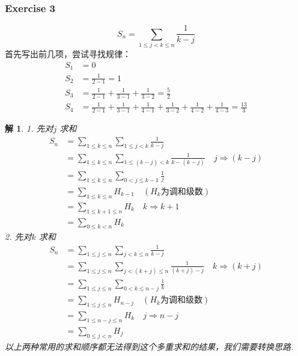 \documentclass[mode=geye]{elegantnote}
\newtheorem{solve}{解}
\begin{document}
\subsubsection{Exercise 3}
\begin{equation*}
    S_n = \sum_{1\leqslant j < k\leqslant n}\frac{1}{k-j}
\end{equation*}
首先写出前几项，尝试寻找规律：
\begin{align*}
    S_1 &= 0\\
    S_2 &= \frac{1}{2-1} = 1\\
    S_3 &= \frac{1}{2-1}+\frac{1}{3-1}+\frac{1}{3-2} = \frac{5}{2}\\
    S_4 &= \frac{1}{2-1}+\frac{1}{3-1}+\frac{1}{4-1}+\frac{1}{3-2}+\frac{1}{4-2}+\frac{1}{4-3} = \frac{13}{3}
\end{align*}
\begin{solve}
    1. 先对$ j $ 求和
    \begin{align*}
        S_n 
        &= \sum_{1\leqslant k \leqslant n} \sum_{1\leqslant j < k}\frac{1}{k-j}\\
        &= \sum_{1\leqslant k \leqslant n} \sum_{1\leqslant (k-j) < k}\frac{1}{k-(k-j)} \quad j\Rightarrow (k-j) \\
        &= \sum_{1\leqslant k \leqslant n} \sum_{0<j\leqslant k-1}\frac{1}{j} \\
        &= \sum_{1\leqslant k \leqslant n} H_{k-1} \quad(H_k\text{为调和级数})\\
        &= \sum_{1\leqslant k+1 \leqslant n} H_{k}\quad k\Rightarrow k+1 \\
        &= \sum_{0\leqslant k < n} H_{k}
    \end{align*}
    2. 先对$ k $ 求和
    \begin{align*}
        S_n 
        &= \sum_{1\leqslant j \leqslant n} \sum_{j < k\leqslant n}\frac{1}{k-j}\\
        &= \sum_{1\leqslant j \leqslant n} \sum_{j < (k+j)\leqslant n}\frac{1}{(k+j)-j} \quad k\Rightarrow (k+j) \\
        &= \sum_{1\leqslant j \leqslant n} \sum_{0<k\leqslant n-j}\frac{1}{k} \\
        &= \sum_{1\leqslant j \leqslant n} H_{n-j} \quad(H_k\text{为调和级数})\\
        &= \sum_{1\leqslant n-j \leqslant n} H_{k}\quad j\Rightarrow n-j \\
        &= \sum_{0\leqslant j < n} H_{j}
    \end{align*}
    以上两种常用的求和顺序都无法得到这个多重求和的结果，我们需要转换思路.


\end{solve}
\end{document}
